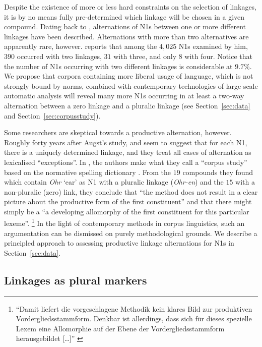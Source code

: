 Despite the existence of more or less hard constraints on the selection of linkages, it is by no means fully pre-determined which linkage will be chosen in a given compound.
Dating back to \textcite{Augst1975}, alternations of N1s between one or more different linkages have been described.
Alternations with more than two alternatives are apparently rare, however.
\textcite[134--135]{Augst1975} reports that among the $4,025$ N1s examined by him, $390$ occurred with two linkages, $31$ with three, and only $8$ with four.
Notice that the number of N1s occurring with two different linkages is considerable at $9.7\%$.
We propose that corpora containing more liberal usage of language, which is not strongly bound by norms, combined with contemporary technologies of large-scale automatic analysis will reveal many more N1s occurring in at least a two-way alternation between a zero linkage and a pluralic linkage (see Section~\ref{sec:data} and Section~\ref{sec:corpusstudy}).

Some researchers are skeptical towards a productive alternation, however.
Roughly forty years after Augst's study, \textcite[31]{NeefBorgwaldt2012} and \textcite[46]{Neef2015} seem to suggest that for each N1, there is a uniquely determined linkage, and they treat all cases of alternation as lexicalised ``exceptions''.
In \textcite[42]{NeefBorgwaldt2012}, the authors make what they call a ``corpus study'' based on the normative spelling dictionary \textcite{Duden2006}.
From the $19$ compounds they found which contain \textit{Ohr} `ear' as N1 with a pluralic linkage (\textit{Ohr-en}) and the $15$ with a non-pluralic (zero) link, they conclude that ``the method does not result in a clear picture about the productive form of the first constituent'' and that there might simply be a ``a developing allomorphy of the first constituent for this particular lexeme''.%
\footnote{``Damit liefert die vorgeschlagene Methodik kein klares Bild zur produktiven Vordergliedsstammform.
Denkbar ist allerdings, dass sich für dieses spezielle Lexem eine Allomorphie auf der Ebene der Vordergliedsstammform herausgebildet [\ldots]'' \parencite[31]{NeefBorgwaldt2012}}
In the light of contemporary methods in corpus linguistics, such an argumentation can be dismissed on purely methodological grounds.
We describe a principled approach to assessing productive linkage alternations for N1s in Section~\ref{sec:data}.


\subsection{Linkages as plural markers}
\label{sec:linkagesaspluralmarkers}

